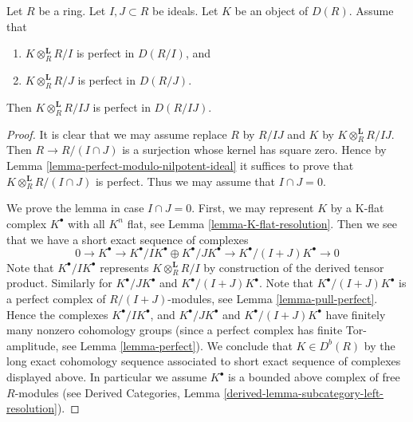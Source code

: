 \begin{lemma}
\label{lemma-perfect-modulo-two-ideals}
Let $R$ be a ring. Let $I, J \subset R$ be ideals.
Let $K$ be an object of $D(R)$. Assume that
\begin{enumerate}
\item $K \otimes_R^\mathbf{L} R/I$ is perfect in $D(R/I)$, and
\item $K \otimes_R^\mathbf{L} R/J$ is perfect in $D(R/J)$.
\end{enumerate}
Then $K \otimes_R^\mathbf{L} R/IJ$ is perfect in $D(R/IJ)$.
\end{lemma}

\begin{proof}
It is clear that we may assume replace $R$ by $R/IJ$ and $K$ by
$K \otimes_R^\mathbf{L} R/IJ$. Then $R \to R/(I \cap J)$ is
a surjection whose kernel has square zero. Hence by
Lemma \ref{lemma-perfect-modulo-nilpotent-ideal}
it suffices to prove that $K \otimes_R^\mathbf{L} R/(I \cap J)$ is
perfect. Thus we may assume that $I \cap J = 0$.

\medskip\noindent
We prove the lemma in case $I \cap J = 0$. First, we may represent $K$
by a K-flat complex $K^\bullet$ with all $K^n$ flat, see
Lemma \ref{lemma-K-flat-resolution}. Then we see that we have a short
exact sequence of complexes
$$
0 \to
K^\bullet \to K^\bullet/IK^\bullet \oplus K^\bullet/JK^\bullet \to
K^\bullet/(I + J)K^\bullet \to 0
$$
Note that $K^\bullet/IK^\bullet$ represents $K \otimes^\mathbf{L}_R R/I$
by construction of the derived tensor product. Similarly for
$K^\bullet/JK^\bullet$ and $K^\bullet/(I + J)K^\bullet$.
Note that $K^\bullet/(I + J)K^\bullet$ is a perfect complex
of $R/(I + J)$-modules, see
Lemma \ref{lemma-pull-perfect}.
Hence the complexes $K^\bullet/IK^\bullet$, and
$K^\bullet/JK^\bullet$ and $K^\bullet/(I + J)K^\bullet$
have finitely many nonzero cohomology groups
(since a perfect complex has finite Tor-amplitude, see
Lemma \ref{lemma-perfect}). We conclude that $K \in D^b(R)$ by the
long exact cohomology sequence associated to short exact sequence
of complexes displayed above. In particular we assume $K^\bullet$
is a bounded above complex of free $R$-modules (see
Derived Categories, Lemma \ref{derived-lemma-subcategory-left-resolution}).


\end{proof}
